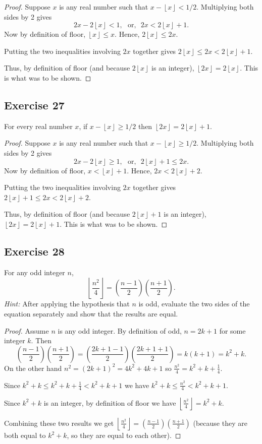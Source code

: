 \documentclass[14pt]{extarticle}
\newcommand{\dps}{\displaystyle}
\newcommand{\floor}[1]{{\left\lfloor#1\right\rfloor}}
\begin{document}
\begin{proof}
    Suppose $x$ is any real number such that $x - \floor{x} < 1/2$. Multiplying both sides by 2 gives
    \[
        2x - 2\floor{x} < 1, \,\,\text{ or, }\,\, 2x < 2\floor{x} + 1.
    \]
    Now by definition of floor, $\floor{x} \leq x$. Hence, $2\floor{x} \leq 2x$.

    Putting the two inequalities involving $2x$ together gives $2\floor{x} \leq 2x < 2\floor{x} + 1$.

    Thus, by definition of floor (and because $2\floor{x}$ is an integer), $\floor{2x} = 2\floor{x}$. This is what was to be shown.
\end{proof}

\subsection{Exercise 27}
For every real number $x$, if $x - \floor{x} \geq 1/2$ then $\floor{2x} = 2\floor{x} + 1$.

\begin{proof}
    Suppose $x$ is any real number such that $x - \floor{x} \geq 1/2$. Multiplying both sides by 2 gives
    \[
        2x - 2\floor{x} \geq 1, \,\,\text{ or, }\,\, 2\floor{x}+1 \leq 2x.
    \]
    Now by definition of floor, $x < \floor{x} + 1$. Hence, $2x < 2\floor{x} + 2$.

    Putting the two inequalities involving $2x$ together gives $2\floor{x} + 1 \leq 2x < 2\floor{x} + 2$.

    Thus, by definition of floor (and because $2\floor{x} + 1$ is an integer), $\floor{2x} = 2\floor{x} + 1$. This is what was to be shown.
\end{proof}

\subsection{Exercise 28}
For any odd integer $n$,
\[
    \floor{\frac{n^2}{4}} = \left(\frac{n-1}{2}\right)\left(\frac{n+1}{2}\right).
\]
{\it Hint:} After applying the hypothesis that $n$ is odd, evaluate the two sides of the equation separately and show
that the results are equal.

\begin{proof}
    Assume $n$ is any odd integer. By definition of odd, $n = 2k+1$ for some integer $k$. Then
    \[
        \left(\frac{n-1}{2}\right)\left(\frac{n+1}{2}\right) = \left(\frac{2k+1-1}{2}\right)\left(\frac{2k+1+1}{2}\right) = k(k+1) = k^2+k.
    \]
    On the other hand $n^2 = (2k+1)^2 = 4k^2+4k+1$ so $\frac{n^2}{4} = k^2+k+\frac{1}{4}$.

    Since $k^2+k \leq k^2+k+\frac{1}{4} < k^2+k+1$ we have $k^2+k \leq \frac{n^2}{4} < k^2+k+1$.

    Since $k^2+k$ is an integer, by definition of floor we have $\dps\floor{\frac{n^2}{4}} = k^2+k$.

    Combining these two results we get $\dps\floor{\frac{n^2}{4}} = \left(\frac{n-1}{2}\right)\left(\frac{n+1}{2}\right)$ (because they are both equal to $k^2+k$, so they are equal to each other).
\end{proof}
\end{document}
